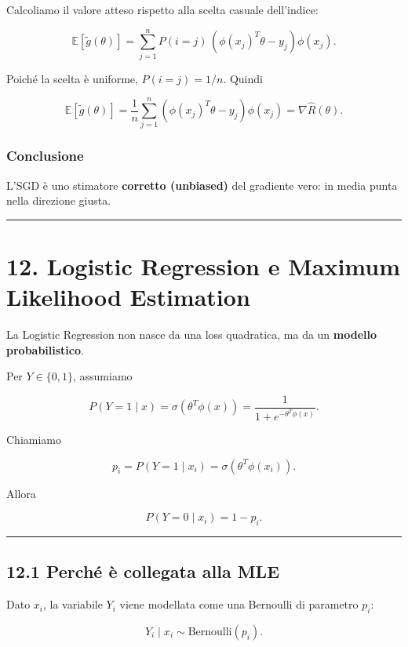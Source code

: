 \documentclass[
]{article}
\begin{document}
Calcoliamo il valore atteso rispetto alla scelta casuale dell'indice:

\[
\mathbb{E}[\tilde g(\theta)]
=
\sum_{j=1}^n P(i=j)\,(\phi(x_j)^T\theta-y_j)\phi(x_j).
\]

Poiché la scelta è uniforme, \(P(i=j)=1/n\). Quindi

\[
\mathbb{E}[\tilde g(\theta)]
=
\frac{1}{n}\sum_{j=1}^n (\phi(x_j)^T\theta-y_j)\phi(x_j)
=
\nabla \hat R(\theta).
\]

\subsubsection{Conclusione}\label{conclusione-6}

L'SGD è uno stimatore \textbf{corretto (unbiased)} del gradiente vero:
in media punta nella direzione giusta.

\begin{center}\rule{0.5\linewidth}{0.5pt}\end{center}

\section{12. Logistic Regression e Maximum Likelihood
Estimation}\label{logistic-regression-e-maximum-likelihood-estimation}

La Logistic Regression non nasce da una loss quadratica, ma da un
\textbf{modello probabilistico}.

Per \(Y\in\{0,1\}\), assumiamo

\[
P(Y=1\mid x)=\sigma(\theta^T\phi(x))
=
\frac{1}{1+e^{-\theta^T\phi(x)}}.
\]

Chiamiamo

\[
p_i = P(Y=1\mid x_i)=\sigma(\theta^T\phi(x_i)).
\]

Allora

\[
P(Y=0\mid x_i)=1-p_i.
\]

\begin{center}\rule{0.5\linewidth}{0.5pt}\end{center}

\subsection{12.1 Perché è collegata alla
MLE}\label{perchuxe9-uxe8-collegata-alla-mle}

Dato \(x_i\), la variabile \(Y_i\) viene modellata come una Bernoulli di
parametro \(p_i\):

\[
Y_i\mid x_i \sim \text{Bernoulli}(p_i).
\]
\end{document}
